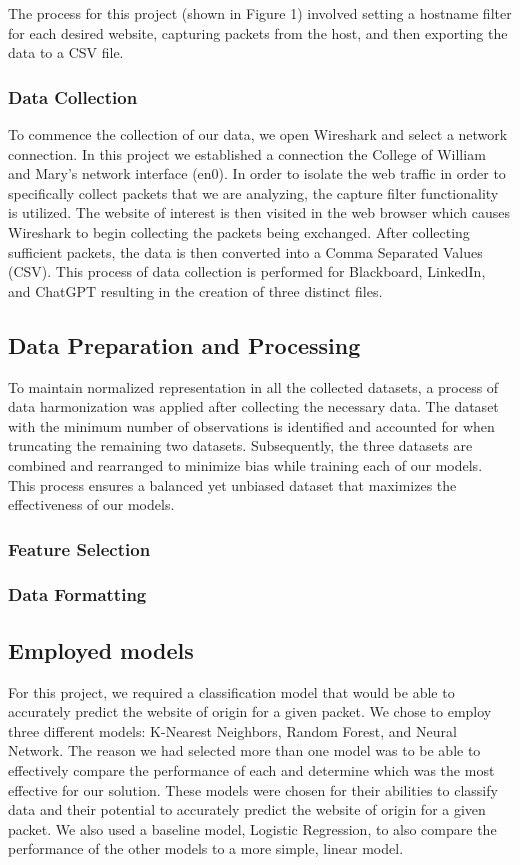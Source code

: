 \documentclass[10pt,sigconf,letterpaper,nonacm]{acmart}
\begin{document}
 The process for this project (shown in Figure 1) involved setting a hostname filter for each desired website, capturing packets from the host, and then exporting the data to a CSV file.

 \subsubsection{Data Collection}
To commence the collection of our data, we open Wireshark and select a network connection. 
In this project we established a connection the College of William and Mary's network interface (en0). In order to isolate the web traffic in order to specifically collect 
packets that we are analyzing, the capture filter functionality is utilized. The website of interest is then visited in the web browser which causes Wireshark to begin collecting the packets being exchanged.
After collecting sufficient packets, the data is then converted into a Comma Separated Values (CSV). This process of data collection is performed for Blackboard, LinkedIn, and ChatGPT resulting in the creation of 
three distinct files. 

\subsection{Data Preparation and Processing}
To maintain normalized representation in all the collected datasets, a process of data harmonization 
was applied after collecting the necessary data. The dataset with the minimum number of observations is identified and accounted for when
truncating the remaining two datasets. Subsequently, the three datasets are combined and rearranged to minimize bias while training each of our models.
This process ensures a balanced yet unbiased dataset that maximizes the effectiveness of our models.



\subsubsection{Feature Selection}

\subsubsection{Data Formatting}

\subsection{Employed models}
For this project, we required a classification model that would be able to accurately predict the website of origin for a given packet. We chose to employ three different models: K-Nearest Neighbors, Random Forest, and Neural Network. The reason we had selected more than one model was to be able to effectively compare the performance of each and determine which was the most effective for our solution. 
These models were chosen for their abilities to classify data and their potential to accurately predict the website of origin for a given packet. We also used a baseline model, Logistic Regression, to also compare the performance of the other models to a more simple, linear model.
\end{document}
